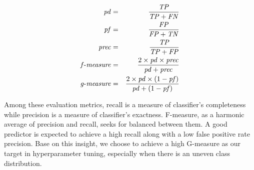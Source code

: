 \begin{eqnarray}
    \mathit{pd} &=& \frac{\mathit{TP}}{\mathit{TP}+\mathit{FN}} \\
    \mathit{pf} &=& \frac{\mathit{FP}}{\mathit{FP}+\mathit{TN}} \\
    \mathit{prec} &=& \frac{\mathit{TP}}{\mathit{TP}+\mathit{FP}} \\
    \mathit{f\textnormal{-}measure} &=& \frac{2 \times \mathit{pd} \times \mathit{prec}}{\mathit{pd}+\mathit{prec}} \\
    \mathit{g\textnormal{-}measure} &=& \frac{2 \times \mathit{pd} \times (1-\mathit{pf})}{\mathit{pd} + (1-\mathit{pf})}
\end{eqnarray}

Among these evaluation metrics, recall is a measure of classifier's completeness while precision is a measure of classifier's exactness. F-measure, as a harmonic average of precision and recall, seeks for  balanced between them. A good predictor is expected to achieve a high recall along with a low false positive rate precision. Base on this insight, we choose to achieve a high G-measure as our target in hyperparameter tuning, especially when there is an uneven class distribution.







